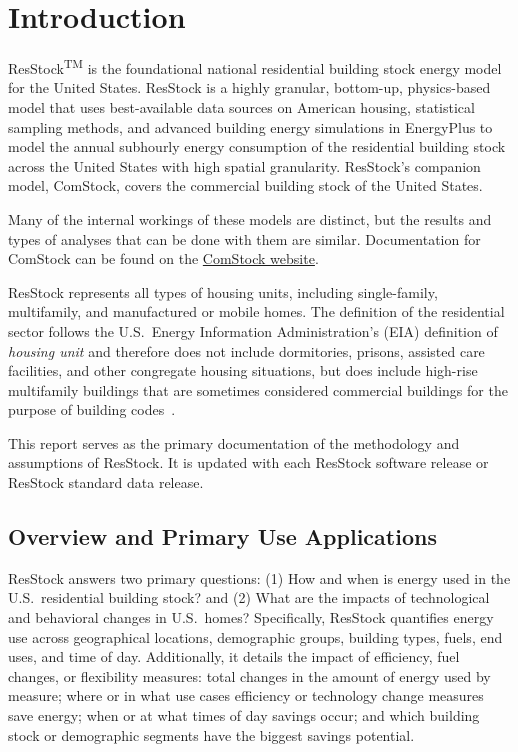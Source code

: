 \chapter{Introduction}

ResStock\textsuperscript{TM} is the foundational national residential building stock energy model for the United States. ResStock is a highly granular, bottom-up, physics-based model that uses best-available data sources on American housing, statistical sampling methods, and advanced building energy simulations in EnergyPlus\textsuperscript{\textregistered} to model the annual subhourly energy consumption of the residential building stock across the United States with high spatial granularity. ResStock's companion model, ComStock, covers the commercial building stock of the United States.

Many of the internal workings of these models are distinct, but the results and types of analyses that can be done with them are similar. Documentation for ComStock can be found on the \href{https://nrel.github.io/ComStock.github.io/}{ComStock website}.

ResStock represents all types of housing units, including single-family, multifamily, and manufactured or mobile homes. The definition of the residential sector follows the U.S.~Energy Information Administration's (EIA) definition of \textit{housing unit} and therefore does not include dormitories, prisons, assisted care facilities, and other congregate housing situations, but does include high-rise multifamily buildings that are sometimes considered commercial buildings for the purpose of building codes~\citep{eia_recs2024}.

This report serves as the primary documentation of the methodology and assumptions of ResStock. It is updated with each ResStock software release or ResStock standard data release.

\section{Overview and Primary Use Applications}

ResStock answers two primary questions: (1) How and when is energy used in the U.S.~residential building stock? and (2) What are the impacts of technological and behavioral changes in U.S.~homes? Specifically, ResStock quantifies energy use across geographical locations, demographic groups, building types, fuels, end uses, and time of day. Additionally, it details the impact of efficiency, fuel changes, or flexibility measures: total changes in the amount of energy used by measure; where or in what use cases efficiency or technology change measures save energy; when or at what times of day savings occur; and which building stock or demographic segments have the biggest savings potential.

